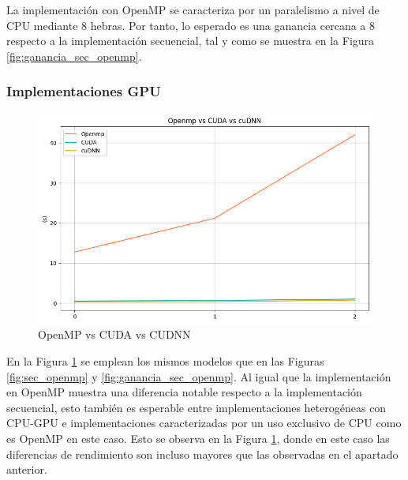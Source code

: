 La implementación con OpenMP se caracteriza por un paralelismo a nivel de CPU mediante 8 hebras. Por tanto, lo esperado es una ganancia cercana a 8 respecto a la implementación secuencial, tal y como se muestra en la Figura \ref{fig:ganancia_sec_openmp}.

\vspace{10mm}

\subsubsection{Implementaciones GPU}

\begin{figure}[H]
	\centering
	\includegraphics[scale=0.52]{imagenes/openmp_cuda_cudnn.png}  
	\caption{OpenMP vs CUDA vs CUDNN}
	\label{fig:openmp_cuda_cudnn}
\end{figure}

\newpage

En la Figura \ref{fig:openmp_cuda_cudnn} se emplean los mismos modelos que en las Figuras \ref{fig:sec_openmp} y \ref{fig:ganancia_sec_openmp}.
Al igual que la implementación en OpenMP muestra una diferencia notable respecto a la implementación secuencial, esto también es esperable entre implementaciones heterogéneas con CPU-GPU e implementaciones caracterizadas por un uso exclusivo de CPU como es OpenMP en este caso. Esto se observa en la Figura \ref{fig:openmp_cuda_cudnn}, donde en este caso las diferencias de rendimiento son incluso mayores que las observadas en el apartado anterior.

